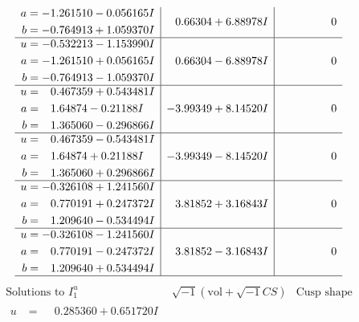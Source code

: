 \documentclass[1p]{elsarticle_modified}
\theoremstyle{definition}
\newcommand{\I}{\sqrt{-1}}
\begin{document}
$$\begin{array}{c|c|c}
\begin{aligned}
a &= -1.261510 - 0.056165 I \\
b &= -0.764913 + 1.059370 I\end{aligned}
 & \phantom{-}0.66304 + 6.88978 I & \phantom{-0.000000 } 0 \\ \hline\begin{aligned}
u &= -0.532213 - 1.153990 I \\
a &= -1.261510 + 0.056165 I \\
b &= -0.764913 - 1.059370 I\end{aligned}
 & \phantom{-}0.66304 - 6.88978 I & \phantom{-0.000000 } 0 \\ \hline\begin{aligned}
u &= \phantom{-}0.467359 + 0.543481 I \\
a &= \phantom{-}1.64874 - 0.21188 I \\
b &= \phantom{-}1.365060 - 0.296866 I\end{aligned}
 & -3.99349 + 8.14520 I & \phantom{-0.000000 } 0 \\ \hline\begin{aligned}
u &= \phantom{-}0.467359 - 0.543481 I \\
a &= \phantom{-}1.64874 + 0.21188 I \\
b &= \phantom{-}1.365060 + 0.296866 I\end{aligned}
 & -3.99349 - 8.14520 I & \phantom{-0.000000 } 0 \\ \hline\begin{aligned}
u &= -0.326108 + 1.241560 I \\
a &= \phantom{-}0.770191 + 0.247372 I \\
b &= \phantom{-}1.209640 - 0.534494 I\end{aligned}
 & \phantom{-}3.81852 + 3.16843 I & \phantom{-0.000000 } 0 \\ \hline\begin{aligned}
u &= -0.326108 - 1.241560 I \\
a &= \phantom{-}0.770191 - 0.247372 I \\
b &= \phantom{-}1.209640 + 0.534494 I\end{aligned}
 & \phantom{-}3.81852 - 3.16843 I & \phantom{-0.000000 } 0\\
 \hline 
 \end{array}$$\newpage$$\begin{array}{c|c|c}  
\text{Solutions to }I^u_{1}& \I (\text{vol} + \sqrt{-1}CS) & \text{Cusp shape}\\
 \hline 
\begin{aligned}
u &= \phantom{-}0.285360 + 0.651720 I \\

\end{aligned}
\end{array}$$
\end{document}
